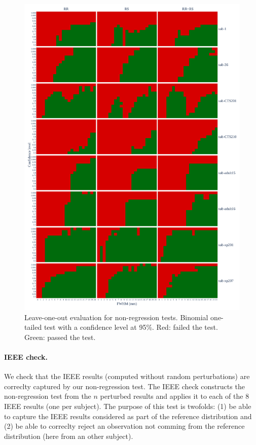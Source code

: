\documentclass{article}
\begin{document}
\begin{figure}
    \centering
    \includegraphics[width=\linewidth]{figures/exclude_mct_fwe_bonferroni.pdf}
    \caption{Leave-one-out evaluation for non-regression tests.
        Binomial one-tailed test with a confidence level at 95\%.
        Red: failed the test. Green: passed the test.}
    \label{fig:loo_bonferroni}
\end{figure}


\paragraph{IEEE check.} We check that the IEEE results (computed without random
perturbations) are correclty captured by our non-regression test. The IEEE check
constructs the non-regression test from the $n$ perturbed results and applies it
to each of the 8 IEEE results (one per subject). The purpose of this test is
twofolds: (1) be able to capture the IEEE results considered as part of the
reference distribution and (2) be able to correclty reject an observation not
comming from the reference distribution (here from an other subject).
\end{document}

